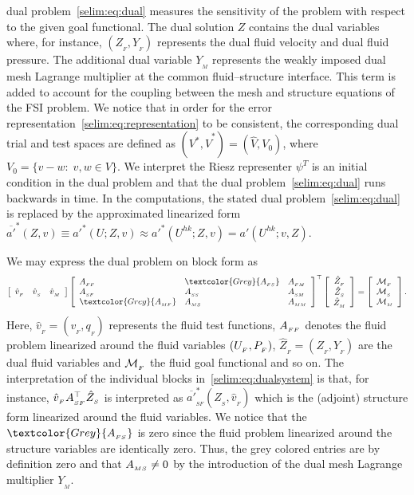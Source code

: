 dual problem~\eqref{selim:eq:dual} measures the sensitivity of the
problem with respect to the given goal functional. The dual solution
$Z$ contains the dual variables where, for instance, $(Z_{_{F}},
Y_{_{F}})$ represents the dual fluid velocity and dual fluid pressure.
The additional dual variable $Y_{_{M}}$ represents the weakly imposed
dual mesh Lagrange multiplier at the common fluid--structure
interface.  This term is added to account for the coupling between the
mesh and structure equations of the FSI problem.  We notice that in
order for the error representation~\eqref{selim:eq:representation} to
be consistent, the corresponding dual trial and test spaces are
defined as $(V^*,\hat{V}^*)=(\hat{V}, V_0)$, where  $V_0 = \{v-w:\;v,w\in V
\}$. We interpret the Riesz representer $\psi^T$ is an initial condition in
the dual problem and that the dual problem~\eqref{selim:eq:dual} runs
backwards in time. In the computations, the stated dual
problem~\eqref{selim:eq:dual} is replaced by the approximated
linearized form $\overline{a'}^{*}(Z, v) \equiv a'^{*}(U; Z, v)
\approx a'^{*}(U^{hk}; Z, v)  = a'(U^{hk}; v, Z)$.

We may express the dual problem on block form as\vspace*{2pt}
\begin{equation}
\label{selim:eq:dualsystem}
\left[\begin{array}{ccc} \hat{v}_{_{F}} & \hat{v}_{_{S}} & \hat{v}_{_{M}}
  \end{array} \right]
\left[\begin{array}{lll} \AFF & \textcolor{Grey}{\AFS} & \AFM
    \\ \ASF & \ASS & \ASM \\ \textcolor{Grey}{\AMF} & \AMS &
    \AMM
\end{array} \right]^{\top}
\left[ \begin{array}{c} \hat{Z}_{_{F}} \\ \hat{Z}_{_{S}}
    \\ \hat{Z}_{_{M}} \end{array} \right] =\left[ \begin{array}{l}
    \M_{_{F}}\\ \M_{{_S}}\\ \M_{_{M}} \end{array} \right].\vspace*{2pt}
\end{equation}
Here, $\hat{v}_{_{F}} = (v_{_{F}}, q_{_{F}})$ represents the fluid
test functions, $A_{_{FF}}$ denotes the fluid problem linearized around the
fluid variables $(U_{_{F}},P_{_{F}})$, $\hat{Z}_{_{F}} = (Z_{_{F}}, Y_{_{F}})$
are the dual fluid variables and $\mathcal{M}_{_{F}}$ the fluid goal functional
and so on. The interpretation of the individual blocks
in~\eqref{selim:eq:dualsystem} is that, for instance,
$\hat{v}_{_{F}}A_{_{SF}}^{\top}\hat{Z}_{_{S}} $ is interpreted as
$\overline{a'}^*_{_{SF}}(\hat{Z}_{_{S}}, \hat{v}_{_{F}})$ which is the
(adjoint) structure form linearized around the fluid variables.  We
notice that the $\textcolor{Grey}{\AFS}$ is zero since the fluid
problem linearized around the structure variables are identically
zero. Thus, the grey colored entries are by definition zero and that
$A_{_{MS}} \neq 0$ by the introduction of the dual mesh Lagrange multiplier
$Y_{_{M}}$.

